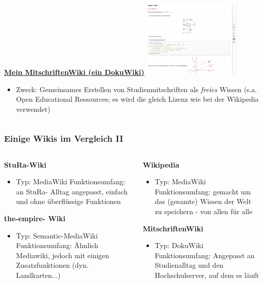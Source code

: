 \documentclass[handout]{beamer}   %
\begin{document}
\begin{frame}
\begin{columns}
\begin{column}{0.5\linewidth}
      \textbf{\href{http://www2.htw-dresden.de/~s70341/cgi-bin/dokuwiki/doku.php}{Mein MitschriftenWiki (ein DokuWiki)}}
	  \includegraphics{180px-MitschriftenWiki-Bsp}
      \begin{itemize}
        \item Zweck: Gemeinsames Erstellen von Studienmitschriften als \emph{freies} Wissen (s.a.  Open Educational Ressources; es wird die gleich Lizenz wie bei der Wikipedia verwendet)
      \end{itemize}

    \end{column}
  \end{columns}
\end{frame}


\begin{frame}
  \frametitle{Einige Wikis im Vergleich II}
  \begin{columns}
    \begin{column}{0.5\linewidth}

      \textbf{StuRa-Wiki}
      \begin{itemize}
        \item Typ: MediaWiki Funktionsumfang: an StuRa- Alltag angepasst, einfach und ohne überflüssige Funktionen
      \end{itemize}

      \textbf{the-empire- Wiki}
      \begin{itemize}
        \item Typ: Semantic-MediaWiki Funktionsumfang: Ähnlich Mediawiki, jedoch mit einigen Zusatzfunktionen (dyn. Landkarten...)
      \end{itemize}
    \end{column}
    \begin{column}{0.5\linewidth}
    
      \textbf{Wikipedia}
      \begin{itemize}
        \item Typ: MediaWiki Funktionsumfang: gemacht um das (gesamte) Wissen der Welt zu speichern - von allen für alle
      \end{itemize}

      \textbf{MitschriftenWiki}
      \begin{itemize}
        \item Typ: DokuWiki Funktionsumfang: Angepasst an Studienalltag und den Hochschulserver, auf dem es läuft
      \end{itemize}
    \end{column}
  \end{columns}
\end{frame}
\end{document}
